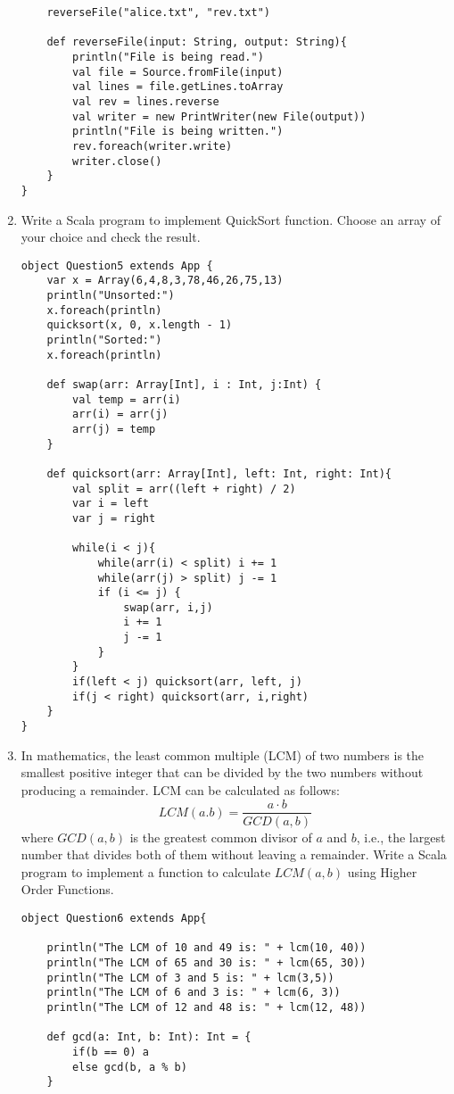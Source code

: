 \documentclass[11pt]{article}
\begin{document}
\begin{enumerate}
\begin{lstlisting}
	reverseFile("alice.txt", "rev.txt")

	def reverseFile(input: String, output: String){
		println("File is being read.")
		val file = Source.fromFile(input)
		val lines = file.getLines.toArray
		val rev = lines.reverse 
		val writer = new PrintWriter(new File(output))
		println("File is being written.")
		rev.foreach(writer.write)
		writer.close()
	}
}

\end{lstlisting}


\item Write a Scala program to implement QuickSort function. Choose an array of your choice and check the result. 
\begin{lstlisting}
object Question5 extends App {
	var x = Array(6,4,8,3,78,46,26,75,13)
	println("Unsorted:")
	x.foreach(println)
	quicksort(x, 0, x.length - 1)
	println("Sorted:")
	x.foreach(println)

	def swap(arr: Array[Int], i : Int, j:Int) {
		val temp = arr(i)
		arr(i) = arr(j)
		arr(j) = temp
	}

	def quicksort(arr: Array[Int], left: Int, right: Int){
		val split = arr((left + right) / 2)
		var i = left
		var j = right

		while(i < j){
			while(arr(i) < split) i += 1
			while(arr(j) > split) j -= 1
			if (i <= j) {
				swap(arr, i,j)
				i += 1
				j -= 1
			}
		}
		if(left < j) quicksort(arr, left, j)
		if(j < right) quicksort(arr, i,right)
	}
}
\end{lstlisting} \newpage

\item In mathematics, the least common multiple (LCM) of two numbers is the smallest positive integer that can be divided by the two numbers without producing a remainder. LCM can be calculated as follows: $$ LCM(a.b) = \frac{a \cdot b}{GCD(a,b)} $$ where $GCD(a,b)$ is the greatest common divisor of $a$ and $b$, i.e., the largest number that divides both of them without leaving a remainder. Write a Scala program to implement a function to calculate $LCM(a,b)$ using Higher Order Functions. 
\begin{lstlisting}
object Question6 extends App{
	
	println("The LCM of 10 and 49 is: " + lcm(10, 40))
	println("The LCM of 65 and 30 is: " + lcm(65, 30))
	println("The LCM of 3 and 5 is: " + lcm(3,5))
	println("The LCM of 6 and 3 is: " + lcm(6, 3))
	println("The LCM of 12 and 48 is: " + lcm(12, 48))

	def gcd(a: Int, b: Int): Int = {
		if(b == 0) a
		else gcd(b, a % b)
	}


\end{lstlisting}
\end{enumerate}
\end{document}
